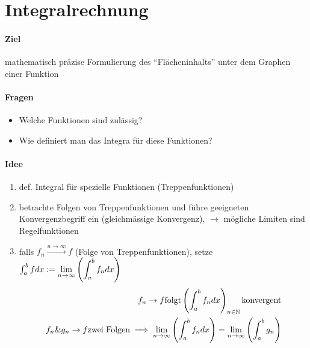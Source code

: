 \section{Integralrechnung}
\paragraph{Ziel} mathematisch präzise Formulierung des ``Flächeninhalts'' unter dem Graphen einer Funktion
\paragraph{Fragen}
\begin{itemize}
  \item Welche Funktionen sind zulässig?
  \item Wie definiert man das Integra für diese Funktionen?
\end{itemize}
\paragraph{Idee}
\begin{enumerate}
  \item def. Integral für spezielle Funktionen (Treppenfunktionen)
  \item betrachte Folgen von Treppenfunktionen und führe geeigneten Konvergenzbegriff ein (gleichmässige Konvergenz), $\to$ mögliche Limiten sind Regelfunktionen
  \item falls $f_n \xrightarrow{n\to\infty}f$ (Folge von Treppenfunktionen), setze $\int_a^b f dx:= \displaystyle\lim_{n\rightarrow\infty}\left( \int^b_a f_n dx \right)$
    \begin{align*}
      f_n\to f \text{folgt} \left( \int^b_a f_n dx \right)_{n\in\mathbb{N}} \text{konvergent}\\
      f_n \& g_n \to f \text{zwei Folgen} \implies \displaystyle\lim_{n\rightarrow\infty} \left( \int^b_a f_n dx \right)=\displaystyle\lim_{n\rightarrow\infty} \left( \int^b_a g_n \right)
    \end{align*}
\end{enumerate}
